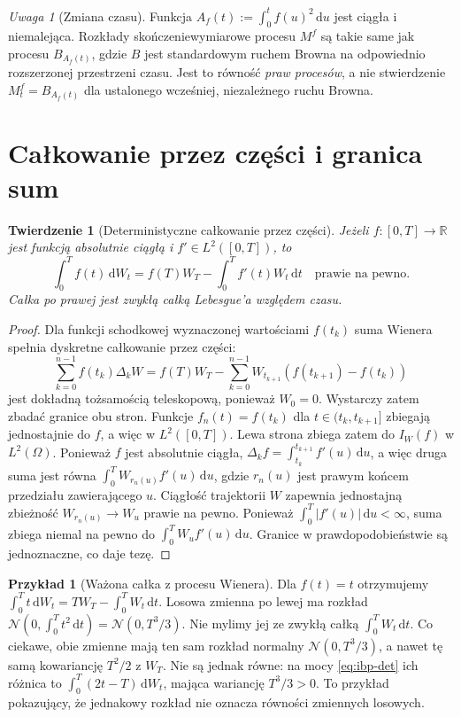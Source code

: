 \documentclass[11pt,a4paper,oneside]{report}
\numberwithin{equation}{chapter}
\theoremstyle{plain}
\newtheorem{twierdzenie}{Twierdzenie}[chapter]
\theoremstyle{definition}
\newtheorem{przyklad}{Przykład}[chapter]
\theoremstyle{remark}
\newtheorem{uwaga}{Uwaga}[chapter]
\newcommand{\R}{\mathbb{R}}
\newcommand{\dd}{\mathrm{d}}
\newcommand{\Normal}{\mathcal{N}}
\begin{document}
\begin{uwaga}[Zmiana czasu]
Funkcja $A_f(t):=\int_0^tf(u)^2\,\dd u$ jest ciągła
i niemalejąca. Rozkłady skończeniewymiarowe procesu $M^f$
są takie same jak procesu $B_{A_f(t)}$, gdzie $B$
jest standardowym ruchem Browna na odpowiednio rozszerzonej
przestrzeni czasu. Jest to równość \emph{praw procesów},
a nie stwierdzenie $M_t^f=B_{A_f(t)}$ dla ustalonego
wcześniej, niezależnego ruchu Browna.
\end{uwaga}

\section{Całkowanie przez części i granica sum}
\begin{twierdzenie}[Deterministyczne całkowanie przez części]
Jeżeli $f:[0,T]\to\R$ jest funkcją absolutnie ciągłą
i $f'\in L^2([0,T])$, to
\[
\int_0^T f(t)\,\dd W_t
=f(T)W_T-\int_0^T f'(t)W_t\,\dd t
\quad\text{prawie na pewno}.
\tag{1.6}\label{eq:ibp-det}
\]
Całka po prawej jest zwykłą całką Lebesgue'a względem czasu.
\end{twierdzenie}
\begin{proof}
Dla funkcji schodkowej wyznaczonej wartościami $f(t_k)$
suma Wienera spełnia dyskretne całkowanie przez części:
\[
\sum_{k=0}^{n-1}f(t_k)\Delta_kW
=f(T)W_T-\sum_{k=0}^{n-1}W_{t_{k+1}}(f(t_{k+1})-f(t_k))
\]
jest dokładną tożsamością teleskopową, ponieważ $W_0=0$.
Wystarczy zatem zbadać granice obu stron. Funkcje $f_n(t)=f(t_k)$ dla
$t\in(t_k,t_{k+1}]$ zbiegają jednostajnie do $f$,
a więc w $L^2([0,T])$. Lewa strona zbiega zatem do
$I_W(f)$ w $L^2(\Omega)$.
Ponieważ $f$ jest absolutnie ciągła,
$\Delta_k f=\int_{t_k}^{t_{k+1}}f'(u)\,\dd u$,
a więc druga suma jest równa
$\int_0^T W_{r_n(u)}f'(u)\,\dd u$,
gdzie $r_n(u)$ jest prawym końcem przedziału zawierającego $u$.
Ciągłość trajektorii $W$ zapewnia jednostajną zbieżność
$W_{r_n(u)}\to W_u$ prawie na pewno. Ponieważ
$\int_0^T|f'(u)|\,\dd u<\infty$, suma zbiega niemal
na pewno do $\int_0^TW_uf'(u)\,\dd u$.
Granice w prawdopodobieństwie są jednoznaczne, co daje tezę.
\end{proof}

\begin{przyklad}[Ważona całka z procesu Wienera]
Dla $f(t)=t$ otrzymujemy
$\int_0^Tt\,\dd W_t=T W_T-\int_0^TW_t\,\dd t$.
Losowa zmienna po lewej ma rozkład
$\Normal(0,\int_0^Tt^2\,\dd t)=\Normal(0,T^3/3)$.
Nie mylimy jej ze zwykłą całką $\int_0^TW_t\,\dd t$.
Co ciekawe, obie zmienne mają ten sam rozkład normalny
$\Normal(0,T^3/3)$, a nawet tę samą kowariancję
$T^2/2$ z $W_T$. Nie są jednak równe:
na mocy \eqref{eq:ibp-det} ich różnica to
$\int_0^T(2t-T)\,\dd W_t$, mająca wariancję
$T^3/3>0$. To przykład pokazujący, że jednakowy
rozkład nie oznacza równości zmiennych losowych.
\end{przyklad}
\end{document}
